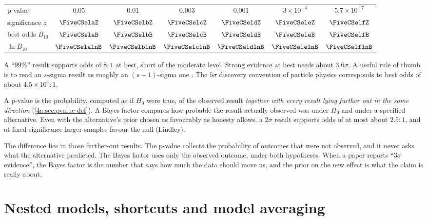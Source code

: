 \begin{center}
\small
\renewcommand{\arraystretch}{1.15}
\begin{tabular}{@{}lcccccc@{}}
\toprule
p-value & $0.05$ & $0.01$ & $0.003$ & $0.001$ & $3\times10^{-4}$ & $5.7\times10^{-7}$\\
significance $z$ & $\FiveCSelaZ$ & $\FiveCSelbZ$ & $\FiveCSelcZ$ & $\FiveCSeldZ$ & $\FiveCSeleZ$ & $\FiveCSelfZ$\\
best odds $\bar B_{10}$ & $\FiveCSelaB$ & $\FiveCSelbB$ & $\FiveCSelcB$ & $\FiveCSeldB$ & $\FiveCSeleB$ & $\FiveCSelfB$\\
$\ln\bar B_{10}$ & $\FiveCSelalnB$ & $\FiveCSelblnB$ & $\FiveCSelclnB$ & $\FiveCSeldlnB$ & $\FiveCSelelnB$ & $\FiveCSelflnB$\\
\bottomrule
\end{tabular}
\end{center}

\noindent A ``$99\%$'' result supports odds of $8:1$ at best, short of the moderate
level. Strong evidence at best needs about $3.6\sigma$. A useful rule of thumb is to read
an $s$-sigma result as roughly an $(s-1)$-sigma one \cite[p.~18]{Trotta2008}. The
$5\sigma$ discovery convention of particle physics corresponds to best odds of about
$4.5\times10^4:1$.

\begin{keyidea}
A p-value is the probability, computed as if $H_0$ were true, of the observed
result \emph{together with every result lying further out in the same direction}
(\cref{4a:sec:pvalue-def}). A Bayes factor compares how probable the result actually
observed was under $H_0$ and under a specified alternative. Even with the alternative's
prior chosen as favourably as honesty allows, a $2\sigma$ result supports odds of at most
about $2.5:1$, and at fixed significance larger samples favour the null (Lindley).
\end{keyidea}

The difference lies in those further-out results. The p-value collects the probability of
outcomes that were not observed, and it never asks what the alternative predicted. The
Bayes factor uses only the observed outcome, under both hypotheses. When a paper
reports ``$3\sigma$ evidence'', the Bayes factor is the number that says how much the
data should move us, and the prior on the new effect is what the claim is really about.
\section{Nested models, shortcuts and model averaging}
\label{5c:sec:nested}

